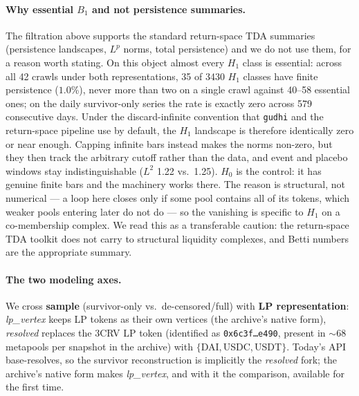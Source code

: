 \documentclass[10pt,twocolumn]{article}
\newcommand{\percent}{\%}
\newcommand{\num}[1]{#1}
\begin{document}
\paragraph{Why essential $B_1$ and not persistence summaries.} The filtration above
supports the standard return-space TDA summaries (persistence landscapes, $L^p$ norms,
total persistence) and we do not use them, for a reason worth stating. On this object
almost every $H_1$ class is essential: across all \num{42} crawls under both
representations, \num{35} of \num{3430} $H_1$ classes have finite persistence
($1.0$\percent), never more than two on a single crawl against 40--58 essential ones; on
the daily survivor-only series the rate is exactly zero across 579 consecutive days. Under
the discard-infinite convention that \texttt{gudhi} and the return-space pipeline use by
default, the $H_1$ landscape is therefore identically zero or near enough. Capping infinite
bars instead makes the norms non-zero, but they then track the arbitrary cutoff rather than
the data, and event and placebo windows stay indistinguishable ($L^2$ 1.22 vs.\ 1.25).
$H_0$ is the control: it has genuine finite bars and the machinery works there. The reason
is structural, not numerical --- a loop here closes only if some pool contains all of its
tokens, which weaker pools entering later do not do --- so the vanishing is specific to $H_1$
on a co-membership complex. We read this as a transferable caution: the return-space TDA
toolkit does not carry to structural liquidity complexes, and Betti numbers are the
appropriate summary.

\paragraph{The two modeling axes.} We cross \textbf{sample} (survivor-only vs.\
de-censored/full) with \textbf{LP representation}: \emph{lp\_vertex} keeps LP tokens as
their own vertices (the archive's native form), \emph{resolved} replaces the 3CRV LP token
(identified as \texttt{0x6c3f\ldots e490}, present in $\sim$68 metapools per snapshot in
the archive) with $\{$DAI,\,USDC,\,USDT$\}$. Today's API base-resolves, so the survivor
reconstruction is implicitly the \emph{resolved} fork; the archive's native form makes
\emph{lp\_vertex}, and with it the comparison, available for the first time.
\end{document}
